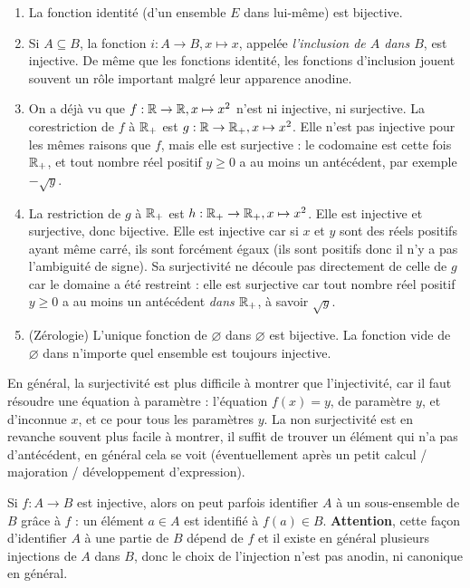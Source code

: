 \begin{exemple}
\begin{enumerate}
\item La fonction identité (d'un ensemble $E$ dans lui-même) est bijective.
\item Si $A\subseteq B$, la fonction $i : A\to B, x\mapsto x$, appelée \emph{l'inclusion de $A$ dans $B$}, est injective. De même que les fonctions identité, les fonctions d'inclusion jouent souvent un rôle important malgré leur apparence anodine.
\item On a déjà vu que $f : \mathbb{R} \to \mathbb{R}, x\mapsto x^2$ n'est ni injective, ni surjective. La corestriction de $f$ à $\mathbb{R}_+$ est $g : \mathbb{R} \to \mathbb{R}_+, x\mapsto x^2$. Elle n'est pas injective pour les mêmes raisons que $f$, mais elle est surjective : le codomaine est cette fois $\mathbb{R}_+$, et tout nombre réel positif $y\geq 0$ a au moins un antécédent, par exemple $-\sqrt{y}$.
\item La restriction de $g$ à $\mathbb{R}_+$ est $h : \mathbb{R}_+ \to \mathbb{R}_+, x\mapsto x^2$. Elle est injective et surjective, donc bijective. Elle est injective car si $x$ et $y$ sont des réels positifs ayant même carré, ils sont forcément égaux (ils sont positifs donc il n'y a pas l'ambiguité de signe). Sa surjectivité ne découle pas directement de celle de $g$ car le domaine a été restreint : elle est surjective car tout nombre réel positif $y\geq 0$ a au moins un antécédent \emph{dans $\mathbb{R}_+$}, à savoir $\sqrt{y}$.
\item (Zérologie) L'unique fonction de $\varnothing$ dans $\varnothing$ est bijective. La fonction vide de $\varnothing$ dans n'importe quel ensemble est toujours injective.
\end{enumerate}
\end{exemple}

\begin{remarque}
En général, la surjectivité est plus difficile à montrer que l'injectivité, car il faut résoudre une équation à paramètre : l'équation $f(x)=y$, de paramètre $y$, et d'inconnue $x$, et ce pour tous les paramètres $y$. La non surjectivité est en revanche souvent plus facile à montrer, il suffit de trouver un élément qui n'a pas d'antécédent, en général cela se voit (éventuellement après un petit calcul / majoration / développement d'expression).
\end{remarque}

\begin{remarque}
Si $f : A\to B$ est injective, alors on peut parfois \og identifier\fg{} $A$ à un sous-ensemble de $B$ grâce à $f$ : un élément $a \in A$ est identifié à $f(a) \in B$. \textbf{Attention}, cette façon d'identifier $A$ à une partie de $B$ dépend de $f$ et il existe en général plusieurs injections de $A$ dans $B$, donc le choix de l'injection n'est pas anodin, ni canonique en général.
\end{remarque}



